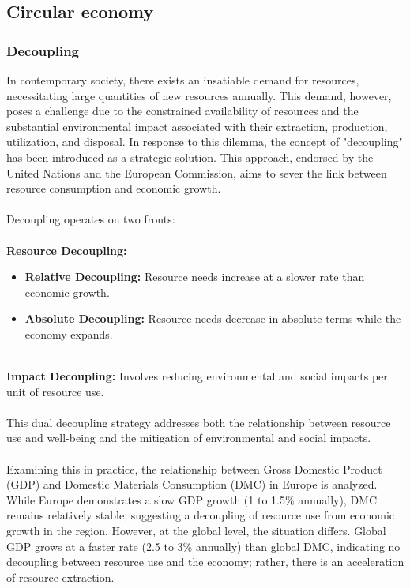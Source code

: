 \documentclass[../summary.tex]{subfiles}
\begin{document}
\subsection{Circular economy}
\subsubsection{Decoupling}

In contemporary society, there exists an insatiable demand for resources, necessitating large quantities of new resources annually. This demand, however, poses a challenge due to the constrained availability of resources and the substantial environmental impact associated with their extraction, production, utilization, and disposal. In response to this dilemma, the concept of "decoupling" has been introduced as a strategic solution. This approach, endorsed by the United Nations and the European Commission, aims to sever the link between resource consumption and economic growth.\\
\\
Decoupling operates on two fronts:\\
\\
\textbf{Resource Decoupling:}
\begin{itemize}
	\item \textbf{Relative Decoupling:} Resource needs increase at a slower rate than economic growth.
	\item \textbf{Absolute Decoupling:} Resource needs decrease in absolute terms while the economy expands.
\end{itemize}
\ \\
\textbf{Impact Decoupling:} Involves reducing environmental and social impacts per unit of resource use.\\
\\
This dual decoupling strategy addresses both the relationship between resource use and well-being and the mitigation of environmental and social impacts.\\
\\
Examining this in practice, the relationship between Gross Domestic Product (GDP) and Domestic Materials Consumption (DMC) in Europe is analyzed. While Europe demonstrates a slow GDP growth (1 to 1.5\% annually), DMC remains relatively stable, suggesting a decoupling of resource use from economic growth in the region. However, at the global level, the situation differs. Global GDP grows at a faster rate (2.5 to 3\% annually) than global DMC, indicating no decoupling between resource use and the economy; rather, there is an acceleration of resource extraction.\\
\end{document}
